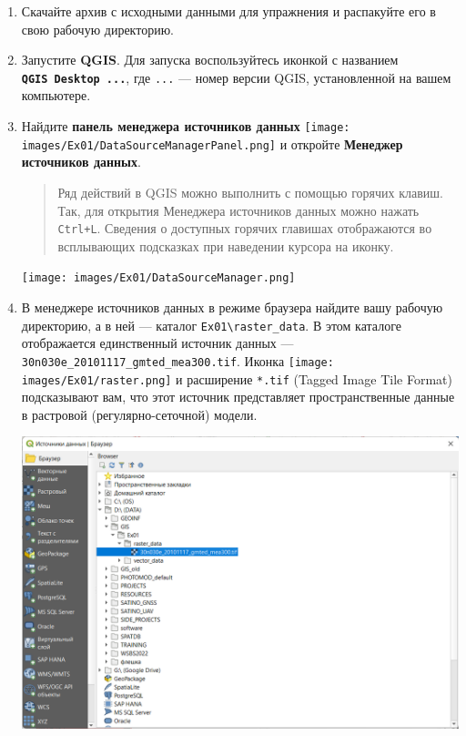 \documentclass[
  12pt,
]{book}
\begin{document}
\begin{enumerate}
\def\labelenumi{\arabic{enumi}.}
\item
  Скачайте архив с исходными данными для упражнения и распакуйте его в свою рабочую директорию.
\item
  Запустите \textbf{QGIS}. Для запуска воспользуйтесь иконкой с названием \textbf{\texttt{QGIS\ Desktop\ ...}}, где \texttt{...} --- номер версии QGIS, установленной на вашем компьютере.
\item
  Найдите \textbf{панель менеджера источников данных} \texttt{[image: images/Ex01/DataSourceManagerPanel.png]} и откройте \textbf{Менеджер источников данных}.

  \begin{quote}
  Ряд действий в QGIS можно выполнить с помощью горячих клавиш. Так, для открытия Менеджера источников данных можно нажать \texttt{Ctrl+L}. Сведения о доступных горячих главишах отображаются во всплывающих подсказках при наведении курсора на иконку.
  \end{quote}

  \texttt{[image: images/Ex01/DataSourceManager.png]}
\item
  В менеджере источников данных в режиме браузера найдите вашу рабочую директорию, а в ней --- каталог \texttt{Ex01\textbackslash{}raster\_data}. В этом каталоге отображается единственный источник данных --- \texttt{30n030e\_20101117\_gmted\_mea300.tif}. Иконка \texttt{[image: images/Ex01/raster.png]} и расширение \texttt{*.tif} (Tagged Image Tile Format) подсказывают вам, что этот источник представляет пространственные данные в растровой (регулярно-сеточной) модели.

  \includegraphics{images/Ex01/DataSourceManager_tif.png}


\end{enumerate}
\end{document}
